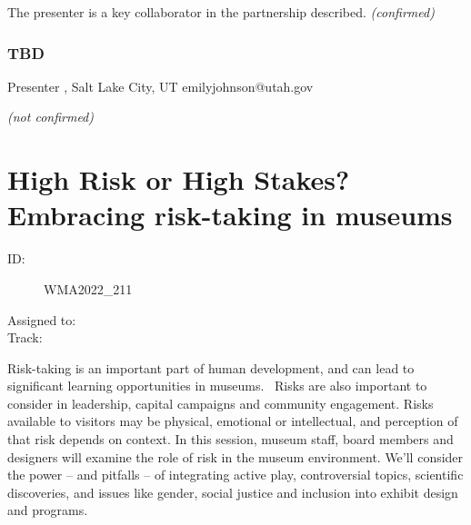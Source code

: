 \documentclass{report}
\begin{document}
                

                The presenter is a key collaborator in the partnership described.
                \emph{ (confirmed) }
              

              
                \subsubsection*{  TBD }
                Presenter\newline
                \newline
                , Salt Lake City, UT
                \newline
                emilyjohnson@utah.gov\newline
                
                

                
                \emph{ (not confirmed) }
              

              

              
        
          \newpage
          \section{ High Risk or High Stakes? Embracing risk-taking in museums }
            \begin{description}
              \item [ID:]
              WMA2022\_211

              \item [Assigned to:]
                \item [Track:]
              \end{description}

              Risk-taking is an important part of human development, and can lead to significant learning opportunities in museums.  Risks are also important to consider in leadership, capital campaigns and community engagement. Risks available to visitors may be physical, emotional or intellectual, and perception of that risk depends on context. In this session, museum staff, board members and designers will examine the role of risk in the museum environment. We’ll consider the power – and pitfalls – of integrating active play, controversial topics, scientific discoveries, and issues like gender, social justice and inclusion into exhibit design and programs.
\end{document}
